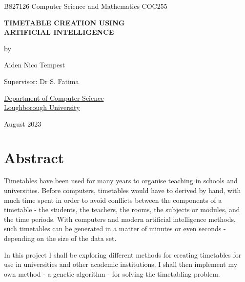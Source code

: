 \documentclass[a4paper, 12pt]{report}
\begin{document}
\graphicspath{{../doc-imgs/}}

\thispagestyle{empty}
\begin{center}
	\Large{
		B827126 \hfill Computer Science and Mathematics \hfill COC255
	}
	\vspace*{\fill}

	\Large{\textbf{TIMETABLE CREATION USING\\ARTIFICIAL INTELLIGENCE}}

	\vspace*{\fill}

	by

	\vspace*{\fill}

	Aiden Nico Tempest

	\vspace*{\fill}

	Supervisor: Dr S. Fatima

	\vspace*{\fill}

	\underline{Department of Computer Science} \\ \underline{Loughborough
	University}

	\vspace*{\fill}
	
	August 2023

\end{center} %

\newpage

\restoregeometry

\section*{Abstract}

Timetables have been used for many years to organise teaching in schools and
universities.
Before computers, timetables would have to derived by hand, with much time spent
in order to avoid conflicts between the components of a timetable - the 
students, the teachers, the rooms, the subjects or modules, and the time 
periods.
With computers and modern artificial intelligence methods, such timetables can
be generated in a matter of minutes or even seconds - depending on the size of
the data set.

In this project I shall be exploring different methods for creating timetables
for use in universities and other academic institutions.
I shall then implement my own method - a genetic algorithm - for solving the 
timetabling problem.
\end{document}
